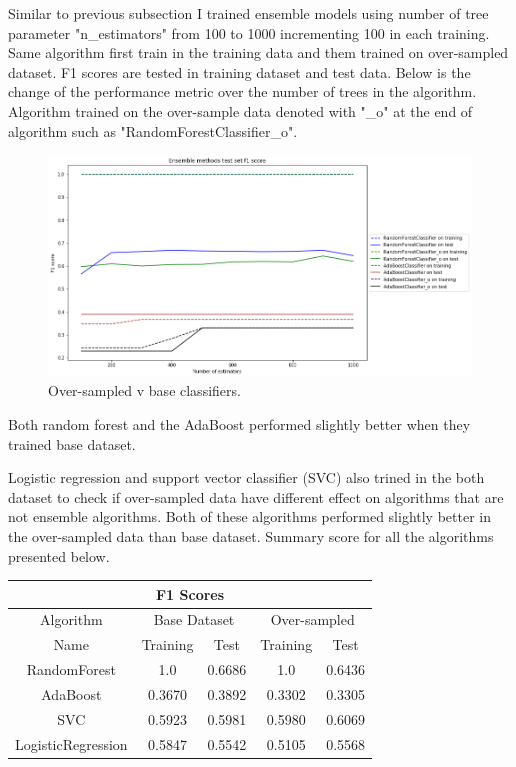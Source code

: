 \documentclass[12pt]{article}
\begin{document}
Similar to previous subsection I trained ensemble models using number of tree parameter "n\_estimators" from 100 to 1000 incrementing 100 in each training. Same algorithm first train in the training data and them trained on over-sampled dataset. F1 scores are tested in training dataset and test data. Below is the change of the performance metric over the number of trees in the algorithm. Algorithm trained on the over-sample data denoted with "\_o" at the end of algorithm such as "RandomForestClassifier\_o".

\begin{figure}[H] \label{fig:overscomp}
    \centering
    \includegraphics[width=\textwidth]{img/ensembleoversample.png}
    \caption{Over-sampled v base classifiers.}
\end{figure}

Both random forest and the AdaBoost performed slightly better when they trained base dataset. 

Logistic regression and support vector classifier (SVC) also trined in the both dataset to check if over-sampled data have different effect on algorithms that are not ensemble algorithms. Both of these algorithms performed slightly better in the over-sampled data than base dataset. Summary score for all the algorithms presented below.

\begin{center}
    \begin{tabular}{||c c c c c||} 
    \hline
    \multicolumn{5}{||c||}{F1 Scores} \\
    \hline
    Algorithm & \multicolumn{2}{c}{Base Dataset} & \multicolumn{2}{c||}{Over-sampled} \\
    Name & Training & Test & Training & Test \\ [0.5ex] 
    \hline\hline
    RandomForest & 1.0 & 0.6686 & 1.0 & 0.6436\\ 
    \hline
    AdaBoost & 0.3670 & 0.3892 & 0.3302 & 0.3305\\ 
    \hline
    SVC & 0.5923 & 0.5981 & 0.5980 & 0.6069\\ 
    \hline
    LogisticRegression & 0.5847 & 0.5542 & 0.5105 & 0.5568\\ [1ex] 
    \hline
   \end{tabular}
\end{center}
\end{document}

